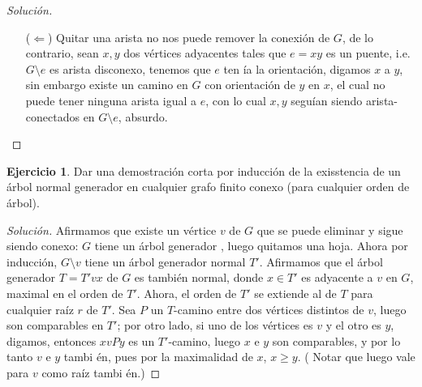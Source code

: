 \documentclass[12pt]{report}
\theoremstyle{plain}
\theoremstyle{definition}
\newtheorem{exercise}[theorem]{Ejercicio}
\newenvironment{solution}{\begin{proof}[Solución]}{\end{proof}}
\begin{document}
\begin{solution}
\begin{enumerate}
    \item[($\Leftarrow$)] Quitar una arista no nos puede remover la conexión de $G$, de lo contrario, sean $x,y$ dos
    vértices adyacentes tales que $e = xy$ es un puente, i.e. $G\setminus e$ es arista disconexo, tenemos que $e$ ten
    ía la orientación,
    digamos $x$ a $y$, sin embargo existe un camino en $G$ con orientación de $y$ en $x$, el cual no puede tener
    ninguna arista igual a $e$, con lo cual $x,y$ seguían siendo arista-conectados en $G \setminus e$, absurdo.
    \end{enumerate}
\end{solution}

\begin{exercise}
    Dar una demostración corta por inducción de la exisstencia de un árbol normal generador en cualquier grafo finito
     conexo (para cualquier orden de árbol).
\end{exercise}
\begin{solution}
    Afirmamos que existe un vértice $v$ de $G$ que se puede eliminar y sigue siendo conexo: $G$ tiene un árbol generador
    , luego quitamos una hoja. Ahora por inducción, $G \setminus v$ tiene un árbol generador normal $T'$. Afirmamos
    que el árbol generador $T = T' vx$ de $G$ es también normal, donde $x \in T'$ es adyacente a $v$ en $G$, maximal
    en el orden de $T'$.
    Ahora, el orden de $T'$ se extiende al de $T$ para cualquier raíz $r$ de $T'$. Sea $P$ un $T$-camino entre dos vértices
    distintos de $v$, luego son comparables en $T'$; por otro lado, si uno de los vértices es $v$ y el otro es $y$,
    digamos, entonces $x v P y$ es un $T'$-camino, luego $x$ e $y$ son comparables, y por lo tanto $v$ e $y$ tambi
    én, pues por la maximalidad de $x$, $x \geq y$. (
    Notar
    que
    luego
    vale para $v$
    como raíz
    tambi
    én.)
\end{solution}
\end{document}
